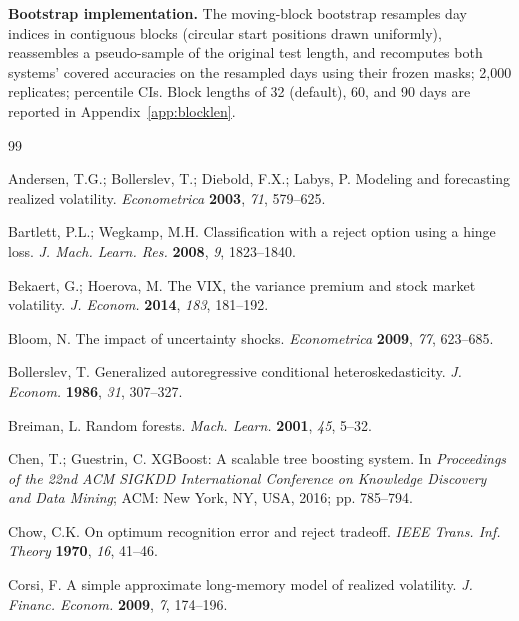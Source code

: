 \documentclass[12pt]{article}
\begin{document}
\textbf{Bootstrap implementation.} The moving-block bootstrap resamples day indices in
contiguous blocks (circular start positions drawn uniformly), reassembles a pseudo-sample of
the original test length, and recomputes both systems' covered accuracies on the resampled
days using their frozen masks; 2,000 replicates; percentile CIs. Block lengths of 32
(default), 60, and 90 days are reported in Appendix~\ref{app:blocklen}.


\begin{thebibliography}{99}

Andersen, T.G.; Bollerslev, T.; Diebold, F.X.; Labys, P.
Modeling and forecasting realized volatility.
\textit{Econometrica} \textbf{2003}, \textit{71}, 579--625.

Bartlett, P.L.; Wegkamp, M.H.
Classification with a reject option using a hinge loss.
\textit{J. Mach. Learn. Res.} \textbf{2008}, \textit{9}, 1823--1840.

Bekaert, G.; Hoerova, M.
The VIX, the variance premium and stock market volatility.
\textit{J. Econom.} \textbf{2014}, \textit{183}, 181--192.

Bloom, N.
The impact of uncertainty shocks.
\textit{Econometrica} \textbf{2009}, \textit{77}, 623--685.

Bollerslev, T.
Generalized autoregressive conditional heteroskedasticity.
\textit{J. Econom.} \textbf{1986}, \textit{31}, 307--327.

Breiman, L.
Random forests.
\textit{Mach. Learn.} \textbf{2001}, \textit{45}, 5--32.

Chen, T.; Guestrin, C.
XGBoost: A scalable tree boosting system.
In \textit{Proceedings of the 22nd ACM SIGKDD International Conference on Knowledge Discovery
and Data Mining}; ACM: New York, NY, USA, 2016; pp. 785--794.

Chow, C.K.
On optimum recognition error and reject tradeoff.
\textit{IEEE Trans. Inf. Theory} \textbf{1970}, \textit{16}, 41--46.

Corsi, F.
A simple approximate long-memory model of realized volatility.
\textit{J. Financ. Econom.} \textbf{2009}, \textit{7}, 174--196.


\end{thebibliography}
\end{document}
